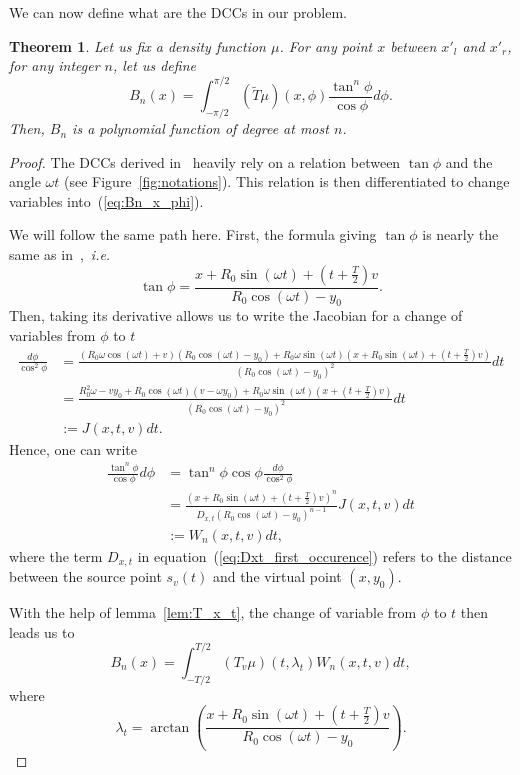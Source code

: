 \documentclass[a4paper]{article}
\numberwithin{equation}{section}
\newtheorem{theorem}{Theorem}
\begin{document}
We can now define what are the DCCs in our problem.
\begin{theorem}
Let us fix a density function $\mu$. For any point $x$ between $x'_l$ and $x'_r$, for any integer $n$, let us define
\begin{equation}
	B_n(x) = \int_{-\pi/2}^{\pi/2} \left( \tilde{T}\mu	\right)(x,\phi) \frac{\tan^n \phi}{\cos \phi} d\phi.	
	\label{eq:Bn_x_phi}
\end{equation}
Then, $B_n$ is a polynomial function of degree at most $n$.
\end{theorem}
\begin{proof}
The DCCs derived in~\cite{clackdoyle2015consistency} heavily rely on a relation between $\tan \phi$ and the angle $\omega t$ (see Figure~\ref{fig:notations}). This relation is then differentiated to change variables into~(\ref{eq:Bn_x_phi}).

We will follow the same path here. First, the formula giving $\tan \phi$ is nearly the same as in~\cite{clackdoyle2015consistency},~\emph{i.e.}
$$
\tan \phi = \frac{x + R_0 \sin(\omega t) + \left( t + \frac{T}{2} \right)v}{R_0 \cos(\omega t) - y_0}.
$$
Then, taking its derivative allows us to write the Jacobian for a change of variables from $\phi$ to $t$
\begin{align*}
\frac{d\phi}{\cos^2 \phi} &= \frac{ \left( R_0 \omega \cos(\omega t) +v \right) \left( R_0 \cos(\omega t) - y_0 \right) + R_0 \omega \sin(\omega t) \left( x + R_0 \sin(\omega t) + \left( t + \frac{T}{2} \right)v \right) }{ \left( R_0 \cos(\omega t) - y_0 \right)^2 } dt \\
 &= \frac{ R_0^2 \omega - v y_0 + R_0 \cos(\omega t)(v-\omega y_0) + R_0 \omega \sin(\omega t)(x + \left( t + \frac{T}{2} \right)v ) }{ \left( R_0 \cos(\omega t) - y_0 \right)^2 } dt\\
 &:= J(x,t,v) dt.
\end{align*}
Hence, one can write
\begin{align}
	\frac{\tan^n \phi}{\cos \phi} d\phi &= \tan^n \phi \cos \phi \frac{d\phi}{\cos^2 \phi} \\
	&= \frac{ \left( x+R_0 \sin(\omega t) + \left( t + \frac{T}{2} \right)v \right)^n }{D_{x,t} \left( R_0 \cos(\omega t) - y_0 \right)^{n-1}} J(x,t,v) dt \label{eq:Dxt_first_occurence} \\
	&:= W_n(x,t,v) dt,
\end{align}
where the term $D_{x,t}$ in equation~(\ref{eq:Dxt_first_occurence}) refers to the distance between the source point $s_v(t)$ and the virtual point $(x,y_0)$.

With the help of lemma~\ref{lem:T_x_t}, the change of variable from $\phi$ to $t$ then leads us to
\begin{equation}
	B_n(x) = \int_{-T/2}^{T/2} \left( T_v \mu \right)(t,\lambda_t) W_n(x,t,v) dt,
	\label{eq:Bnx_DCC}
\end{equation}
where
\begin{equation}
	\lambda_t = \arctan \left( \frac{x + R_0 \sin(\omega t) + \left( t + \frac{T}{2} \right)v}{R_0 \cos(\omega t) - y_0} \right).
\end{equation}
\end{proof}
\end{document}

